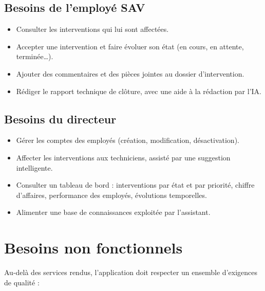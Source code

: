 \subsection{Besoins de l'employé SAV}
\begin{itemize}
  \item Consulter les interventions qui lui sont affectées.
  \item Accepter une intervention et faire évoluer son état (en cours, en attente, terminée…).
  \item Ajouter des commentaires et des pièces jointes au dossier d'intervention.
  \item Rédiger le rapport technique de clôture, avec une aide à la rédaction par l'IA.
\end{itemize}

\subsection{Besoins du directeur}
\begin{itemize}
  \item Gérer les comptes des employés (création, modification, désactivation).
  \item Affecter les interventions aux techniciens, assisté par une suggestion intelligente.
  \item Consulter un tableau de bord : interventions par état et par priorité, chiffre d'affaires, performance des employés, évolutions temporelles.
  \item Alimenter une base de connaissances exploitée par l'assistant.
\end{itemize}

\section{Besoins non fonctionnels}
Au-delà des services rendus, l'application doit respecter un ensemble d'exigences de qualité :

